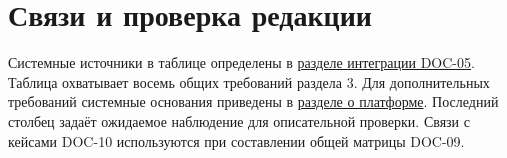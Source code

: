 \documentclass[12pt,a4paper]{article}
\begin{document}
\section{Связи и проверка редакции}\label{5-ux441ux432ux44fux437ux438-ux438-ux43fux440ux43eux432ux435ux440ux43aux430-ux440ux435ux434ux430ux43aux446ux438ux438}

\hypertarget{5-связи-и-проверка-редакции}{}

Системные источники в таблице определены в {\href{../04\_Системные\_требования/DOC-05\_Системные\_требования.pdf\#doc-05-общесистемная-интеграция}{разделе интеграции DOC-05}}. Таблица охватывает восемь общих требований раздела 3. Для дополнительных требований системные основания приведены в {\hyperlink{doc-06-программные-требования-платформы}{разделе о платформе}}. Последний столбец задаёт ожидаемое наблюдение для описательной проверки. Связи с кейсами DOC-10 используются при составлении общей матрицы DOC-09.
\end{document}
